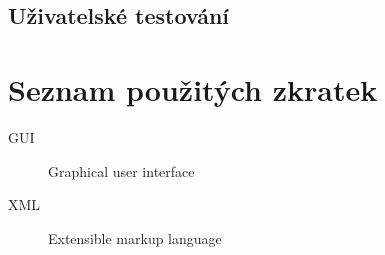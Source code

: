 \documentclass[thesis=B,czech]{FITthesis}[2019/12/23]
\begin{document}
\section{Uživatelské testování}



\begin{conclusion}
\end{conclusion}




\appendix

\chapter{Seznam použitých zkratek}
\begin{description}
	\item[GUI] Graphical user interface
	\item[XML] Extensible markup language
\end{description}
\end{document}
